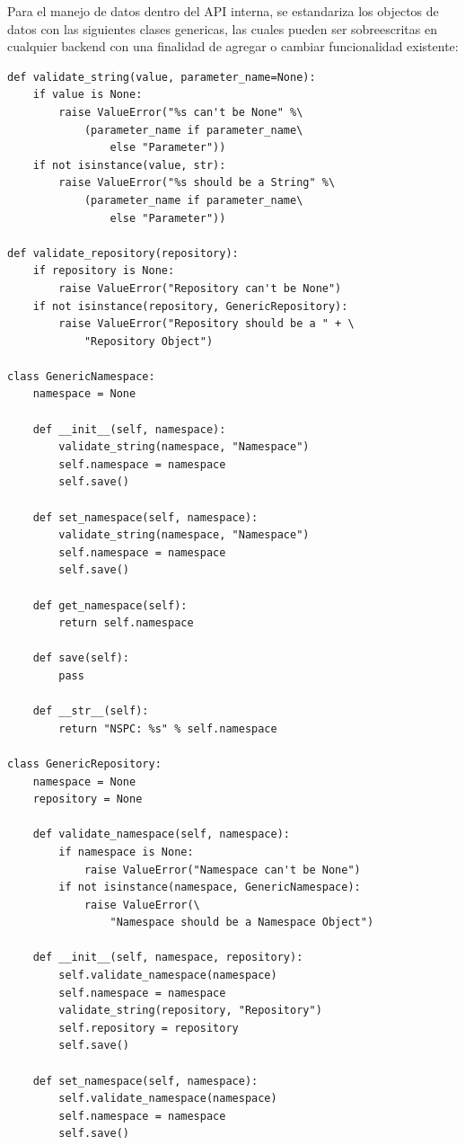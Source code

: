 Para el manejo de datos dentro del API interna, se estandariza los objectos de datos con las siguientes clases genericas, las cuales pueden ser sobreescritas en cualquier backend con una finalidad de agregar o cambiar funcionalidad existente:
\lstset{language=Python}
\begin{lstlisting}
def validate_string(value, parameter_name=None):
    if value is None:
        raise ValueError("%s can't be None" %\
            (parameter_name if parameter_name\
                else "Parameter"))
    if not isinstance(value, str):
        raise ValueError("%s should be a String" %\
            (parameter_name if parameter_name\
                else "Parameter"))

def validate_repository(repository):
    if repository is None:
        raise ValueError("Repository can't be None")
    if not isinstance(repository, GenericRepository):
        raise ValueError("Repository should be a " + \
            "Repository Object")

class GenericNamespace:
    namespace = None

    def __init__(self, namespace):
        validate_string(namespace, "Namespace")
        self.namespace = namespace
        self.save()

    def set_namespace(self, namespace):
        validate_string(namespace, "Namespace")
        self.namespace = namespace
        self.save()

    def get_namespace(self):
        return self.namespace

    def save(self):
        pass

    def __str__(self):
        return "NSPC: %s" % self.namespace

class GenericRepository:
    namespace = None
    repository = None

    def validate_namespace(self, namespace):
        if namespace is None:
            raise ValueError("Namespace can't be None")
        if not isinstance(namespace, GenericNamespace):
            raise ValueError(\
                "Namespace should be a Namespace Object")

    def __init__(self, namespace, repository):
        self.validate_namespace(namespace)
        self.namespace = namespace
        validate_string(repository, "Repository")
        self.repository = repository
        self.save()

    def set_namespace(self, namespace):
        self.validate_namespace(namespace)
        self.namespace = namespace
        self.save()


\end{lstlisting}
